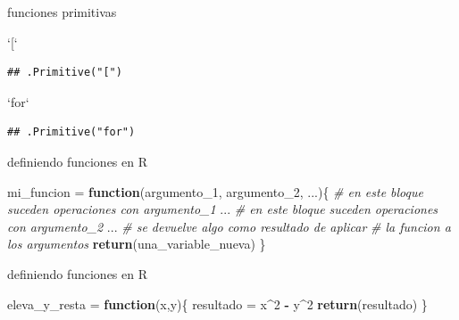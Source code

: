 \documentclass[ignorenonframetext,]{beamer}
\newenvironment{Shaded}{\begin{snugshade}}{\end{snugshade}}
\newcommand{\CommentTok}[1]{\textcolor[rgb]{0.56,0.35,0.01}{\textit{#1}}}
\newcommand{\ControlFlowTok}[1]{\textcolor[rgb]{0.13,0.29,0.53}{\textbf{#1}}}
\newcommand{\DataTypeTok}[1]{\textcolor[rgb]{0.13,0.29,0.53}{#1}}
\newcommand{\DecValTok}[1]{\textcolor[rgb]{0.00,0.00,0.81}{#1}}
\newcommand{\KeywordTok}[1]{\textcolor[rgb]{0.13,0.29,0.53}{\textbf{#1}}}
\newcommand{\NormalTok}[1]{#1}
\newcommand{\OperatorTok}[1]{\textcolor[rgb]{0.81,0.36,0.00}{\textbf{#1}}}
\newcommand{\StringTok}[1]{\textcolor[rgb]{0.31,0.60,0.02}{#1}}
\begin{document}
\begin{frame}[fragile]{funciones primitivas}
\protect\hypertarget{funciones-primitivas-1}{}

\begin{Shaded}
\begin{Highlighting}[]
\StringTok{`}\DataTypeTok{[}\StringTok{`}
\end{Highlighting}
\end{Shaded}

\begin{verbatim}
## .Primitive("[")
\end{verbatim}

\begin{Shaded}
\begin{Highlighting}[]
\StringTok{`}\DataTypeTok{for}\StringTok{`}
\end{Highlighting}
\end{Shaded}

\begin{verbatim}
## .Primitive("for")
\end{verbatim}

\end{frame}

\begin{frame}[fragile]{definiendo funciones en R}
\protect\hypertarget{definiendo-funciones-en-r}{}

\begin{Shaded}
\begin{Highlighting}[]
\NormalTok{mi_funcion =}\StringTok{ }\ControlFlowTok{function}\NormalTok{(argumento_}\DecValTok{1}\NormalTok{, argumento_}\DecValTok{2}\NormalTok{, ...)\{}
  \CommentTok{# en este bloque suceden operaciones con argumento_1}
\NormalTok{  ...}
  \CommentTok{# en este bloque suceden operaciones con argumento_2}
\NormalTok{  ...}
  \CommentTok{# se devuelve algo como resultado de aplicar}
  \CommentTok{# la funcion a los argumentos}
  \KeywordTok{return}\NormalTok{(una_variable_nueva)}
\NormalTok{\}}
\end{Highlighting}
\end{Shaded}

\end{frame}

\begin{frame}[fragile]{definiendo funciones en R}
\protect\hypertarget{definiendo-funciones-en-r-1}{}

\begin{Shaded}
\begin{Highlighting}[]
\NormalTok{eleva_y_resta =}\StringTok{ }\ControlFlowTok{function}\NormalTok{(x,y)\{}
\NormalTok{  resultado =}\StringTok{ }\NormalTok{x}\OperatorTok{^}\DecValTok{2} \OperatorTok{-}\StringTok{ }\NormalTok{y}\OperatorTok{^}\DecValTok{2}
  \KeywordTok{return}\NormalTok{(resultado)}
\NormalTok{\}}
\end{Highlighting}
\end{Shaded}

\end{frame}
\end{document}
